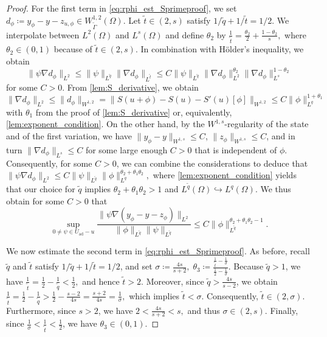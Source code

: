 \documentclass[11pt]{article}
\newcommand{\feas}{U_{\textrm{ad}}}
\theoremstyle{definition}
\theoremstyle{remark}
\begin{document}
\begin{proof}
For the first term in \eqref{eq:rphi_est_Sprimeproof}, we set $d_\phi \coloneqq y_{\phi}-y-z_{u,\phi} \in W^{1,2}_{\tilde\Gamma}(\Omega)$.
Let $\tilde t\in(2,s)$ satisfy $1/\tilde{q} + 1/\tilde{t} = 1/2$. 
We interpolate between $L^2(\Omega)$ and $L^s(\Omega)$ and define $\theta_2$ by
$ \frac{1}{\tilde t}
=
\frac{\theta_2}{2}
+
\frac{1-\theta_2}{s},$ 
where $\theta_2 \in (0,1)$ because of $\tilde{t} \in (2,s)$. In combination with H\"older's inequality, we obtain
%
\begin{equation}\label{eq:interpolation_en}
\|\psi \nabla d_\phi\|_{L^2} \le  \|\psi\|_{L^{\tilde q}} \|\nabla d_\phi\|_{L^{\tilde t}}
\le C  \|\psi\|_{L^{\tilde q}} \|\nabla d_\phi\|_{L^2}^{\theta_2} \|\nabla d_\phi\|_{L^s}^{1-\theta_2}
\end{equation}
%
for some $C > 0$.
From \cref{lem:S_derivative}, we obtain
%
\begin{equation}\label{eq:lemma311_L2_bound}
\|\nabla d_\phi\|_{L^2} \le \|d_\phi\|_{W^{1,2}}
=
\|S(u+\phi)-S(u)-S'(u)[\phi]\|_{W^{1,2}}
\le C \|\phi\|_{L^q}^{1+\theta_1}
\end{equation}
%
with  $\theta_1$ from the proof of \cref{lem:S_derivative} or, equivalently, 
\cref{lem:exponent_condition}. On the other hand, by the $W^{1,s}$-regularity of the state and of the first variation,
we have $\|y_{\phi}-y\|_{W^{1,s}} \le C$, $\|z_{\phi}\|_{W^{1,s}} \le C$, and in turn
$\|\nabla d_\phi\|_{L^s} \le C$ for some large enough $C > 0$ that is independent of $\phi$.
Consequently, for some $C > 0$, we can combine the considerations to deduce that $
\|\psi \nabla d_\phi\|_{L^2}
\le
C\|\psi\|_{L^{\tilde q}}
\|\phi\|_{L^q}^{\theta_2+\theta_1\theta_2},$ 
where \cref{lem:exponent_condition} yields that our choice for $\tilde q$ implies
$\theta_2+\theta_1\theta_2>1$ and $L^{\tilde q}(\Omega) \hookrightarrow L^q(\Omega)$.
We thus obtain for some $C > 0$ that
\begin{equation}\label{eq:first_term_final}
\sup_{0 \neq \psi \in \feas - u} \frac{\|\psi\nabla(y_{\phi}-y -z_{\phi})\|_{L^2}}{\|\phi\|_{L^{\tilde q}}\|\psi\|_{L^{\tilde q}}}
\le C \|\phi\|_{L^{\tilde q}}^{\theta_2+\theta_1\theta_2 - 1}.
\end{equation}


We now estimate the second term in \eqref{eq:rphi_est_Sprimeproof}.
As before, recall $\tilde{q}$ and $ \tilde{t}$ satisfy $1/\tilde{q} + 1/\tilde{t}= 1/2$, and set $
\sigma \coloneqq  \frac{4s}{s+2}, 
\;
\theta_3 \coloneqq  \frac{\frac{1}{\tilde{t}}-\frac{1}{\sigma}}{\frac{1}{2}-\frac{1}{\sigma}}.$ 
Because $\tilde{q} > 1$, we have
$
\frac{1}{\tilde{t}} = \frac{1}{2} - \frac{1}{\tilde{q}} < \frac{1}{2},
$
and hence $\tilde{t} > 2$. Moreover, since $\tilde{q} > \frac{4s}{s-2}$, we obtain
$
\frac{1}{\tilde{t}}
=
\frac{1}{2} - \frac{1}{\tilde{q}}
>
\frac{1}{2} - \frac{s-2}{4s}
=
\frac{s+2}{4s}
=
\frac{1}{\sigma},
$
which implies $\tilde{t} < \sigma$. Consequently, $\tilde{t} \in (2,\sigma)$. Furthermore, since $s>2$, we have
$
2 < \frac{4s}{s+2} < s,
$
and thus $\sigma \in (2,s)$.  Finally, since $\frac{1}{\sigma} < \frac{1}{\tilde{t}} < \frac{1}{2}$, we have $\theta_3 \in (0,1)$.


\end{proof}
\end{document}
